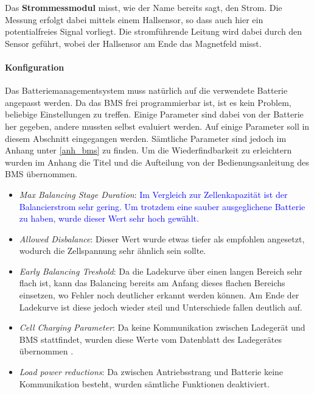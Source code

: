 Das \textbf{Strommessmodul} misst, wie der Name bereits sagt, den Strom. Die Messung erfolgt dabei mittels einem Hallsensor, so dass auch hier ein potentialfreies Signal vorliegt. Die stromführende Leitung wird dabei durch den Sensor geführt, wobei der Hallsensor am Ende das Magnetfeld misst.

\paragraph{Konfiguration}
Das Batteriemanagementsystem muss natürlich auf die verwendete Batterie angepasst werden. Da das BMS frei programmierbar ist, ist es kein Problem, beliebige Einstellungen zu treffen. Einige Parameter sind dabei von der Batterie her gegeben, andere mussten selbst evaluiert werden. Auf einige Parameter soll in diesem Abschnitt eingegangen werden. Sämtliche Parameter sind jedoch im Anhang unter \ref{anh_bms} zu finden. Um die Wiederfindbarkeit zu erleichtern wurden im Anhang die Titel und die Aufteilung von der Bedienungsanleitung des BMS \cite{bms} übernommen. \begin{itemize}
	\item \textit{Max Balancing Stage Duration}: \textcolor{blue}{Im Vergleich zur Zellenkapazität ist der Balancierstrom sehr gering. Um trotzdem eine sauber ausgeglichene Batterie zu haben, wurde dieser Wert sehr hoch gewählt.}
	\item \textit{Allowed Disbalance}: Dieser Wert wurde etwas tiefer als empfohlen angesetzt, wodurch die Zellspannung sehr ähnlich sein sollte.
	\item \textit{Early Balancing Treshold}: Da die Ladekurve über einen langen Bereich sehr flach ist, kann das Balancing bereits am Anfang dieses flachen Bereichs einsetzen, wo Fehler noch deutlicher erkannt werden können. Am Ende der Ladekurve ist diese jedoch wieder steil und Unterschiede fallen deutlich auf.
	\item \textit{Cell Charging Parameter}: Da keine Kommunikation zwischen Ladegerät und BMS stattfindet, wurden diese Werte vom Datenblatt des Ladegerätes übernommen \cite{ladegeraet}.
	\item \textit{Load power reductions}: Da zwischen Antriebsstrang und Batterie keine Kommunikation besteht, wurden sämtliche Funktionen deaktiviert.
\end{itemize}